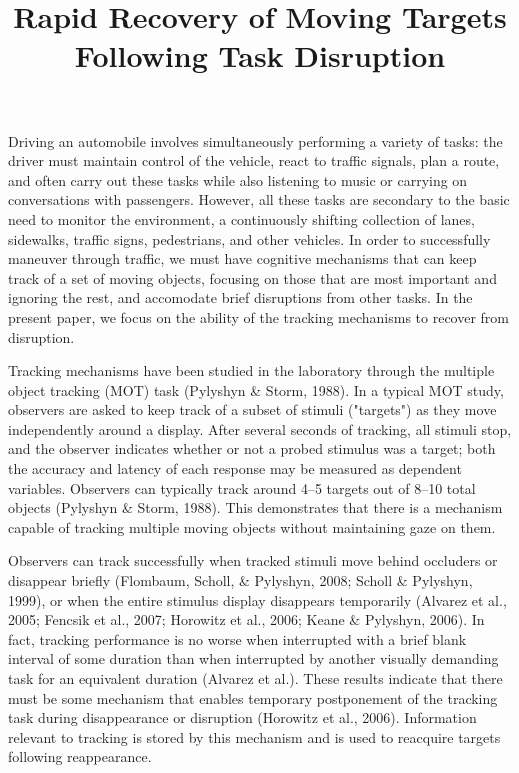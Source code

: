 \documentclass[doc]{apa}
\title{Rapid Recovery of Moving Targets Following Task Disruption}
\begin{document}
\maketitle

Driving an automobile involves simultaneously performing a variety of
tasks: the driver must maintain control of the vehicle, react to traffic
signals, plan a route, and often carry out these tasks while also listening
to music or carrying on conversations with passengers.  However, all these
tasks are secondary to the basic need to monitor the environment, a
continuously shifting collection of lanes, sidewalks, traffic signs,
pedestrians, and other vehicles.  In order to successfully maneuver through
traffic, we must have cognitive mechanisms that can keep track of a set of
moving objects, focusing on those that are most important and ignoring the
rest, and accomodate brief disruptions from other tasks.  In the present
paper, we focus on the ability of the tracking mechanisms to recover from
disruption.

Tracking mechanisms have been studied in the laboratory through the
multiple object tracking (MOT) task (Pylyshyn \& Storm, 1988).  In a
typical MOT study, observers are asked to keep track of a subset of stimuli
("targets") as they move independently around a display.  After several
seconds of tracking, all stimuli stop, and the observer indicates whether
or not a probed stimulus was a target; both the accuracy and latency of
each response may be measured as dependent variables.  Observers can
typically track around 4--5 targets out of 8--10 total objects (Pylyshyn \&
Storm, 1988).  This demonstrates that there is a mechanism capable of
tracking multiple moving objects without maintaining gaze on them.

Observers can track successfully when tracked stimuli move behind occluders
or disappear briefly (Flombaum, Scholl, \& Pylyshyn, 2008; Scholl \&
Pylyshyn, 1999), or when the entire stimulus display disappears temporarily
(Alvarez et al., 2005; Fencsik et al., 2007; Horowitz et al., 2006; Keane
\& Pylyshyn, 2006).  In fact, tracking performance is no worse when
interrupted with a brief blank interval of some duration than when
interrupted by another visually demanding task for an equivalent duration
(Alvarez et al.).  These results indicate that there must be some mechanism
that enables temporary postponement of the tracking task during
disappearance or disruption (Horowitz et al., 2006).  Information relevant
to tracking is stored by this mechanism and is used to reacquire targets
following reappearance.
\end{document}
